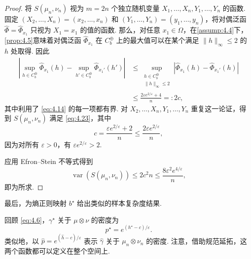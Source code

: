 \begin{proof}
将 $S(\mu_n,\nu_n)$ 视为 $m=2n$ 个独立随机变量 $X_1,\ldots,X_n,Y_1,\ldots,Y_n$ 的函数. 固定 $(X_2,\ldots,X_n)=(x_2,\ldots,x_n)$ 和 $(Y_1,\ldots,Y_n)=(y_1,\ldots,y_n)$，将对偶泛函 $\widehat\Phi=\widehat\Phi_{x_1}$ 只视为 $X_1=x_1$ 的值的函数. 那么，对任意 $x_1\in\Omega$，在\autoref{assump:4.4}下，\autoref{prop:4.5}意味着对偶泛函 $\widehat\Phi_{x_1}$ 在 $C_b^\oplus$ 上的最大值可以在某个满足 $\|h\|_\infty\le2$ 的 $h$ 处取得. 因此
$$\begin{aligned}
\left|\sup_{h\in C_b^\oplus}\widehat\Phi_{x_1}(h)
-\sup_{h'\in C_b^\oplus}\widehat\Phi_{x_1'}(h')\right|
&\le\sup_{\substack{h\in C_b^\oplus\\\|h\|_\infty\le2}}
|\widehat\Phi_{x_1}(h)-\widehat\Phi_{x_1'}(h)|\\
&\le\frac{2\varepsilon e^{2/\varepsilon}+4}n=:2c,
\end{aligned}$$
其中利用了 \eqref{eq:4.14} 的每一项都有界. 对 $X_2,\ldots,X_n,Y_1,\ldots,Y_n$ 重复这一论证，得到 $S(\mu_n,\nu_n)$ 满足 \eqref{eq:4.23}，其中
$$c=\frac{\varepsilon e^{2/\varepsilon}+2}n\le\frac{2\varepsilon e^{2/\varepsilon}}n,$$
因为对所有 $\varepsilon>0$，有 $\varepsilon e^{2/\varepsilon}>2$.

应用 Efron--Stein 不等式得到
$$\operatorname{var}(S(\mu_n,\nu_n))\le2c^2n\le\frac{8\varepsilon^2e^{4/\varepsilon}}n,$$
即为所求.
\end{proof}

最后，为熵正则映射 $b^\star$ 给出类似的样本复杂度结果.

回顾 \eqref{eq:4.6}，$\gamma^\star$ 关于 $\mu\otimes\nu$ 的密度为
$$p^\star=e^{(h^\star-c)/\varepsilon}.$$
类似地，以 $\widehat p=e^{(\widehat h-c)/\varepsilon}$ 表示 $\widehat\gamma$ 关于 $\mu_n\otimes\nu_n$ 的密度. 注意，借助规范延拓，这两个函数都可以定义在整个空间上.

